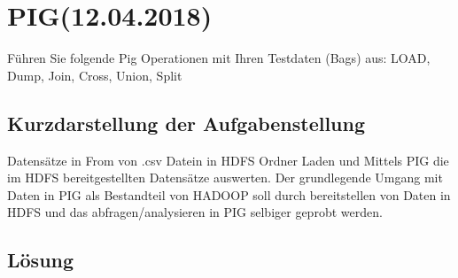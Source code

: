 \section{PIG(12.04.2018)}
Führen Sie folgende Pig Operationen mit Ihren Testdaten (Bags) aus: LOAD,  Dump, Join, Cross, Union, Split

\subsection*{Kurzdarstellung der Aufgabenstellung}
Datensätze in From von .csv Datein in HDFS Ordner Laden und Mittels PIG die im HDFS bereitgestellten Datensätze auswerten. Der grundlegende Umgang mit Daten in PIG als Bestandteil von HADOOP soll durch bereitstellen von Daten in HDFS und das abfragen/analysieren in PIG selbiger geprobt werden.
\subsection*{Lösung}
